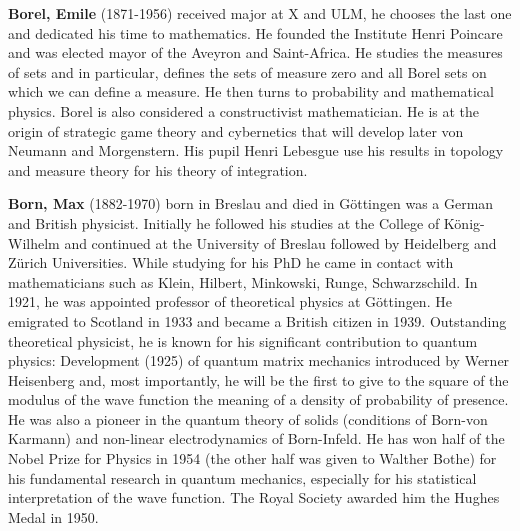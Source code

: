 \textbf{Borel, Emile} (1871-1956) received major at X and ULM, he chooses the last one and dedicated his time to mathematics. He founded the Institute Henri Poincare and was elected mayor of the Aveyron and Saint-Africa. He studies the measures of sets and in particular, defines the sets of measure zero and all Borel sets on which we can define a measure. He then turns to probability and mathematical physics. Borel is also considered a constructivist mathematician. He is at the origin of strategic game theory and cybernetics that will develop later von Neumann and Morgenstern. His pupil Henri Lebesgue use his results in topology and measure theory for his theory of integration.

\textbf{Born, Max} (1882-1970) born in Breslau and died in Göttingen was a German and British physicist. Initially he followed his studies at the College of König-Wilhelm and continued at the University of Breslau followed by Heidelberg and Zürich Universities. While studying for his PhD he came in contact with mathematicians such as Klein, Hilbert, Minkowski, Runge, Schwarzschild. In 1921, he was appointed professor of theoretical physics at Göttingen. He emigrated to Scotland in 1933 and became a British citizen in 1939. Outstanding theoretical physicist, he is known for his significant contribution to quantum physics: Development (1925) of quantum matrix mechanics introduced by Werner Heisenberg and, most importantly, he will be the first to give to the square of the modulus of the wave function the meaning of a density of probability of presence. He was also a pioneer in the quantum theory of solids (conditions of Born-von Karmann) and non-linear electrodynamics of Born-Infeld. He has won half of the Nobel Prize for Physics in 1954 (the other half was given to Walther Bothe) for his fundamental research in quantum mechanics, especially for his statistical interpretation of the wave function. The Royal Society awarded him the Hughes Medal in 1950.


